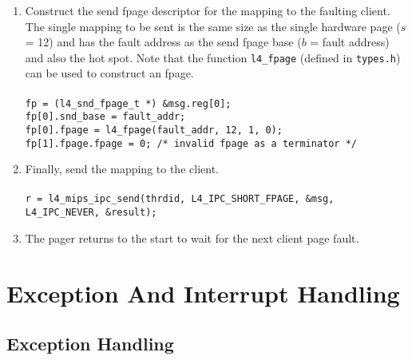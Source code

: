 \begin{enumerate}
\item Construct the send fpage descriptor for the  mapping to the
  faulting client. The single mapping to be sent is the same size as the
  single hardware page ($s$ = 12) and has the fault address as the send
  fpage base ($b$ = fault address) and also the hot spot. Note that the
  function {\footnotesize\verb+l4_fpage+} (defined in {\footnotesize\verb+types.h+}) can be used to
  construct an fpage. \\ \\
  \hspace*{20pt} {\footnotesize\verb+fp = (l4_snd_fpage_t *) &msg.reg[0];+} \\
  \hspace*{20pt} {\footnotesize\verb+fp[0].snd_base = fault_addr;+}\\
  \hspace*{20pt} {\footnotesize\verb+fp[0].fpage = l4_fpage(fault_addr, 12, 1, 0);+}\\
  \hspace*{20pt} {\footnotesize\verb+fp[1].fpage.fpage = 0; /* invalid fpage as a terminator */+}
  
\item Finally, send the mapping to the client. \\ \\
  \hspace*{20pt} {\footnotesize\verb+r = l4_mips_ipc_send(thrdid, L4_IPC_SHORT_FPAGE, &msg,+}\\
  \hspace*{130pt} {\footnotesize\verb+L4_IPC_NEVER, &result);+}
  
\item The pager returns to the start to wait for the next client
  page fault.

\end{enumerate}


\section{Exception And Interrupt Handling}



\subsection{Exception Handling}


